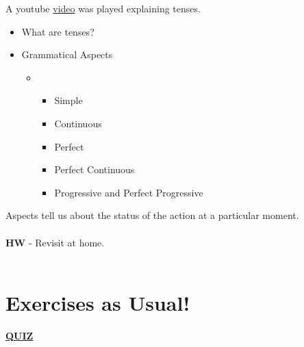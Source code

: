 \documentclass[a4paper,30pt]{report}
\begin{document}
      A youtube \href{https://www.youtube.com/watch?v=54prMaPn5Ls&authuser=1}{video} was played explaining tenses. 
      \begin{itemize}
        \item What are tenses?
        \item Grammatical Aspects \begin{itemize}
        \item \begin{itemize}
            \item Simple
            \item Continuous
            \item Perfect
            \item Perfect Continuous
            \item Progressive and Perfect Progressive
          \end{itemize}
        \end{itemize}
      \end{itemize}
      Aspects tell us about the status of the action at a particular moment.\\\\
      \textbf{HW} - Revisit at home.\\\\
    
    \section{Exercises as Usual!}
      \href{https://www.english-grammar.at/online_exercises/tenses/tenses_index.htm}{\textbf{QUIZ}}
  
  
\end{document}
